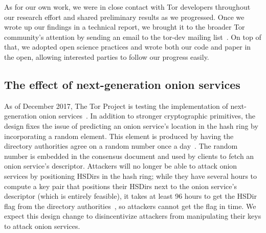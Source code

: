 As for our own work, we were in close contact with Tor developers throughout our
research effort and shared preliminary results as we progressed.  Once we wrote
up our findings in a technical report, we brought it to the broader Tor
community's attention by sending an email to the tor-dev mailing
list~\cite{Roberts2017a}.  On top of that, we adopted open science practices and
wrote both our code and paper in the open, allowing interested parties to follow
our progress easily.

\subsection{The effect of next-generation onion services}
As of December 2017, The Tor Project is testing the implementation of
next-generation onion services~\cite{prop224}.  In addition to stronger
cryptographic primitives, the design fixes the issue of predicting an onion
service's location in the hash ring by incorporating a random element.  This
element is produced by having the directory authorities agree on a random number
once a day~\cite{prop250}.  The random number is embedded in the consensus
document and used by clients to fetch an onion service's descriptor.  Attackers
will no longer be able to attack onion services by positioning HSDirs in the
hash ring; while they have several hours to compute a key pair that positions
their HSDirs next to the onion service's descriptor (which is entirely
feasible), it takes at least 96 hours to get the HSDir flag from the directory
authorities~\cite[\S~3.4.2]{dir-spec}, so attackers cannot get the flag in time.
We expect this design change to disincentivize attackers from manipulating their
keys to attack onion services.
